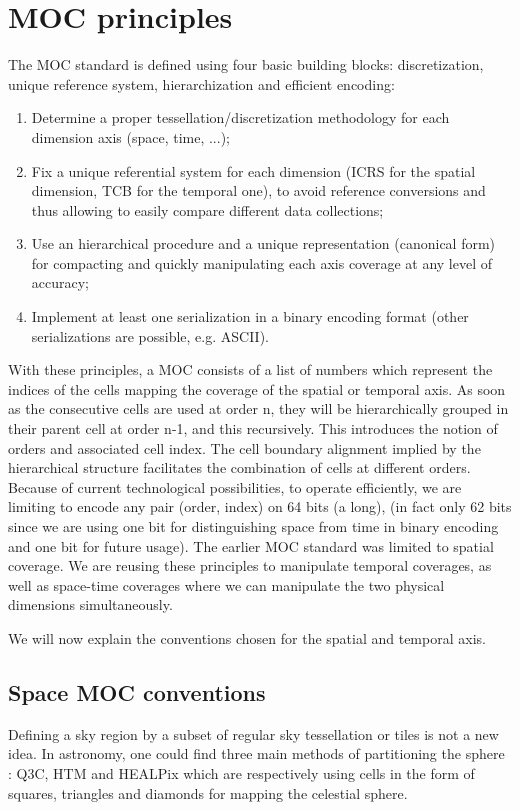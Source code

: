 \documentclass[11pt,a4paper]{ivoa}
\begin{document}
\section{MOC principles}

The MOC standard is defined using four basic building blocks:
discretization, unique reference system, hierarchization and efficient
encoding: 

\begin{enumerate}
\item Determine a proper tessellation/discretization methodology for
  each dimension axis (space, time, ...);
\item Fix a unique referential system for each dimension (ICRS for the
  spatial dimension, TCB for the temporal one), to avoid 
  reference conversions and thus allowing to easily compare different
  data collections; 
\item Use an hierarchical procedure and a unique representation
  (canonical form) for compacting and quickly manipulating each axis
  coverage at any level of accuracy;
\item Implement at least one serialization in a binary encoding format
  (other serializations are possible, e.g. ASCII). 
\end{enumerate} 

With these principles, a MOC consists of a list of numbers which
represent the indices of the cells mapping the coverage of the spatial
or temporal axis.
As soon as the consecutive cells are used at order n, they will be
hierarchically grouped in their parent cell at order n-1, and
this recursively. This introduces the notion of orders and
associated cell index.
The cell boundary alignment implied by the hierarchical structure
facilitates the combination of cells at different orders. 
Because of current technological possibilities,
to operate efficiently, we are limiting to encode any pair (order, index)
on 64 bits (a long), (in fact only 62 bits since we are using one bit
for distinguishing space from time in binary encoding and one bit for
future usage). The earlier MOC standard was limited to spatial coverage.
We are reusing these principles to manipulate temporal coverages,
as well as space-time coverages where we can manipulate the two
physical dimensions simultaneously.

\medskip
\par\noindent
We will now explain the conventions chosen for the spatial and temporal axis.

\subsection{Space MOC conventions}
Defining a sky region by a subset of regular sky tessellation or tiles
is not a new idea.  In astronomy, one could find three main methods of
partitioning the sphere : Q3C, HTM and HEALPix which are respectively
using cells in the form of squares, triangles and diamonds for mapping
the celestial sphere.
\end{document}
